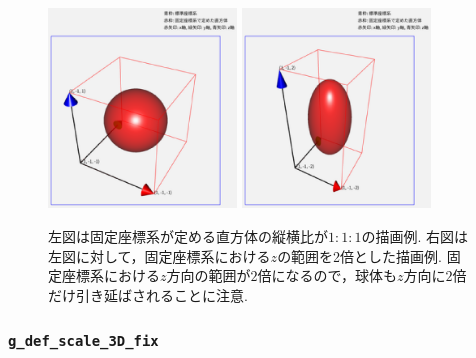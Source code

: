 \documentclass[platex,a4paper,12pt]{jsarticle}%
\begin{document}
\begin{figure}[htb]
\centering
\includegraphics[width=50mm]{g_def_scale_sphere.eps}
 \hspace{0.5zw}
\includegraphics[width=50mm]{g_def_scale_sphere_z2.eps}

\begin{flushleft}
左図は固定座標系が定める直方体の縦横比が$1:1:1$の描画例.
右図は左図に対して，固定座標系における$z$の範囲を2倍とした描画例.
固定座標系における$z$方向の範囲が$2$倍になるので，球体も$z$方向に$2$倍だけ引き延ばされることに注意.
\end{flushleft}
\end{figure}




\clearpage
\subsubsection{\texttt{g\_def\_scale\_3D\_fix}}
\end{document}

